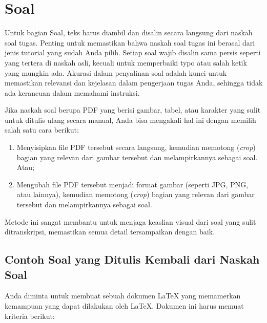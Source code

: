 \section{Soal}


Untuk bagian Soal, teks harus diambil dan disalin secara langsung dari naskah soal tugas. Penting untuk memastikan bahwa naskah soal tugas ini berasal dari jenis tutorial yang sudah Anda pilih. Setiap soal wajib disalin sama persis seperti yang tertera di naskah asli, kecuali untuk memperbaiki typo atau salah ketik yang mungkin ada. Akurasi dalam penyalinan soal adalah kunci untuk memastikan relevansi dan kejelasan dalam pengerjaan tugas Anda, sehingga tidak ada kerancuan dalam memahami instruksi.

Jika naskah soal berupa PDF yang berisi gambar, tabel, atau karakter yang sulit untuk ditulis ulang secara manual, Anda bisa mengakali hal ini dengan memilih salah satu cara berikut: 

\begin{enumerate}
    \item Menyisipkan file PDF tersebut secara langsung, kemudian memotong (\textit{crop}) bagian yang relevan dari gambar tersebut dan melampirkannya sebagai soal. Atau;
    \item Mengubah file PDF tersebut menjadi format gambar (seperti JPG, PNG, atau lainnya), kemudian memotong (\textit{crop}) bagian yang relevan dari gambar tersebut dan melampirkannya sebagai soal.
\end{enumerate}

Metode ini sangat membantu untuk menjaga keaslian visual dari soal yang sulit ditranskripsi, memastikan semua detail tersampaikan dengan baik.

\subsection{Contoh Soal yang Ditulis Kembali dari Naskah Soal}

Anda diminta untuk membuat sebuah dokumen LaTeX yang memamerkan kemampuan yang dapat dilakukan oleh LaTeX. Dokumen ini harus memuat kriteria berikut:

